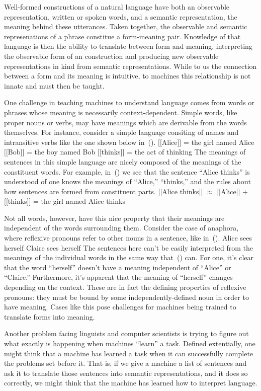 Well-formed constructions of a natural language have both an observable 
representation, written or spoken words, and a semantic representation, the
meaning behind these utterances. Taken together, the observable and semantic
represenations of a phrase constitue a form-meaning pair. Knowledge of that
language is then the ability to translate between form and meaning, 
interpreting the observable form of an construction and producing new 
observable representations in kind from semantic representations. While to us
the connection between a form and its meaning is intuitive, to machines this
relationship is not innate and must then be taught. 

One challenge in teaching machines to understand language comes from words or
phrases whose meaning is necessarily context-dependent. Simple words, like
proper nouns or verbs, may have meanings which are derivable from the words 
themselves. For instance, consider a simple language consiting of names and
intransitive verbs like the one shown below in~(\nextx).
\pex
	\a{} $[[$Alice$]]$ = the girl named Alice
	\a{} $[\![$Bob$]\!]$ = the boy named Bob
	\a{} $[\![$thinks$]\!]$ = the act of thinking
\xe
The meanings of sentences in this simple language are nicely composed of the
meanings of the constituent words. For example, in~(\nextx) we see that the
sentence ``Alice thinks'' is understood of one knows the meanings of ``Alice,''
``thinks,'' and the rules about how sentences are formed from constituent 
parts.
\ex{}
	[[Alice thinks]] $\approx$ [[Alice]] $+$ [[thinks]] = the girl named Alice thinks
\xe

Not all words, however, have this nice property that their meanings are 
independent of the words surrounding them. Consider the case of anaphora, where
reflexive pronouns refer to other nouns in a sentence, like in~(\nextx).
\pex
	\a Alice sees herself
	\a Claire sees herself
\xe
The sentences here can't be easily interpreted from the meanings of the 
individual words in the same way that~(\blastx) can. For one, it's clear that
the word ``herself'' doesn't have a meaning independent of ``Alice'' or 
``Claire.'' Furthermore, it's apparent that the meaning of ``herself'' changes
depending on the context. These are in fact the defining properties of 
reflexive pronouns: they must be bound by some independently-defined noun in
order to have meaning. Cases like this pose challenges for machines being
trained to translate forms into meaning.

Another problem facing linguists and computer scientists is trying to
figure out what exactly is happening when machines ``learn'' a task. Defined
extentially, one might think that a machine has learned a task when it can 
successfully complete the problems set before it. That is, if we give a machine
a list of sentences and ask it to translate those sentences into semantic
representations, and it does so correctly, we might think that the machine
has learned how to interpret language.


